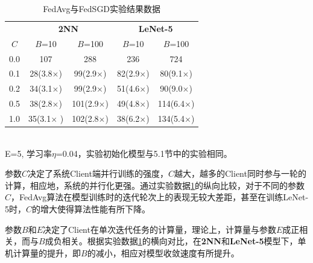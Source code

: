\documentclass[zihao = -4,cn]{oucart}
\begin{document}
\begin{table}[!htbp]
\caption{\label{tab:expFedAvg1}FedAvg与FedSGD实验结果数据}
\begin{center}
\begin{tabular}{ccccc}
\toprule
 & \multicolumn{2}{c}{\textbf{2NN}} & \multicolumn{2}{c}{\textbf{LeNet-5}} \\
$C$ & $B$=10 & $B$=100 & $B$=10 & $B$=100 \\
\midrule
0.0 & 107 & 288 & 236 & 724 \\
0.1 & 28(3.8$\times$)  & 99(2.9$\times$)  & 82(2.9$\times$)  & 80(9.1$\times$)  \\
0.2 & 34(3.1$\times$)  & 99(2.9$\times$)  & 51(4.6$\times$)  & 90(9.0$\times$)  \\
0.5 & 38(2.8$\times$)  & 101(2.9$\times$) & 49(4.8$\times$)  & 114(6.4$\times$) \\
1.0 & 35(3.1$\times$  )& 102(2.8$\times$) & 38(6.2$\times$)  & 134(5.4$\times$) \\
\bottomrule
\end{tabular}
\footnotesize\\
E=5, 学习率$\eta$=0.04，实验初始化模型与5.1节中的实验相同。
\end{center}
\end{table}

参数$C$决定了系统Client端并行训练的强度，$C$越大，越多的Client同时参与一轮的计算，相应地，系统的并行化更强。通过实验数据\ref{tab:expFedAvg1}的纵向比较，对于不同的参数$C$，FedAvg算法在模型训练时的迭代轮次上的表现无较大差距，甚至在训练LeNet-5时，$C$的增大使得算法性能有所下降。\par
参数$B$和$E$决定了Client在单次迭代任务的计算量，理论上，计算量与参数$E$成正相关，而与$B$成负相关。根据实验数据\ref{tab:expFedAvg1}的横向对比，在\textbf{2NN}和\textbf{LeNet-5}模型下，单机计算量的提升，即$B$的减小，相应对模型收敛速度有所提升。\par
\end{document}

